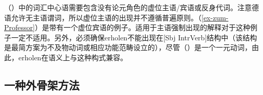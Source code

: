 \begin{exe}
\begin{xlist}[iv.]
\begin{exe}
\begin{xlist}[iv.]
\zl
（）中的词汇中心语需要包含没有论元角色的虚位主语/宾语或反身代词。注意德语允许无主语谓词，所以虚位主语的出现并不遵循普遍原则。（\ref{ex-zum-Professor}）是带有一个虚位宾语的例子。适用于主语强制出现的解释对于这种例子一定不适用。另外，必须确保erholen不能出现在[Sbj IntrVerb]结构中（该结构是最简方案为不及物动词或相应功能范畴设立的），尽管（）是一个一元动词，由此，erholen在语义上与这种构式兼容。


\subsection{一种外骨架方法}
\label{Abschnitt-Diskussion-Haugereid}



\end{xlist}
\end{exe}
\end{xlist}
\end{exe}
